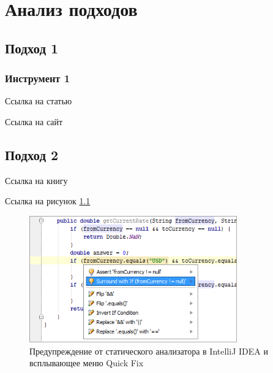 \chapter{Анализ подходов}

\section{Подход 1}

\subsection{Инструмент 1}

Ссылка на статью \cite{russian}

Ссылка на сайт \cite{ANTLR}


\section{Подход 2}

Ссылка на книгу \cite{java-book}

Ссылка на рисунок \ref{fig:idea}

\begin{figure}[htbp]
	\centering
	\includegraphics[width=0.8\textwidth]{fig/code_analysis_bugs.png}
	\caption{Предупреждение от статического анализатора в IntelliJ IDEA и всплывающее меню Quick Fix}%
	\label{fig:idea}
\end{figure}